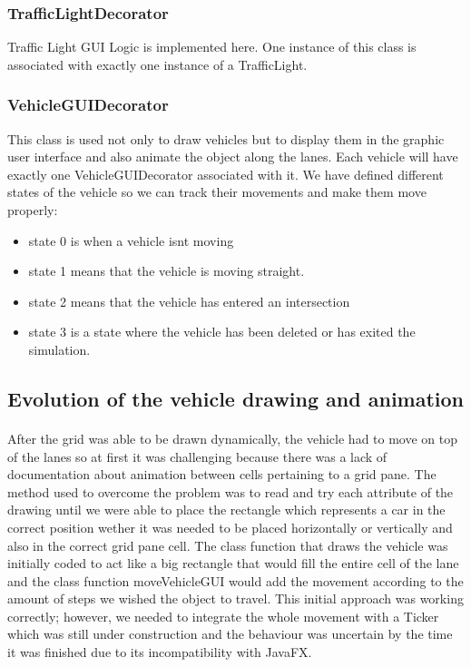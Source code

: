 \documentclass[a4paper]{article}
\begin{document}
\subsubsection{TrafficLightDecorator}
Traffic Light GUI Logic is implemented here. One instance of this class is associated with exactly one instance of a TrafficLight.

\subsubsection{VehicleGUIDecorator}
This class is used not only to draw vehicles but to display them in the graphic user interface and also animate the object along the lanes. Each vehicle will have exactly one VehicleGUIDecorator associated with it. We have defined different states of the vehicle so we can track their movements and make them move properly:

\begin{itemize}
\item state 0 is when a vehicle isn\textsc{}t moving
\item state 1 means that the vehicle is moving straight.
\item state 2 means that the vehicle has entered an intersection
\item state 3 is a state where the vehicle has been deleted or has exited the simulation.
\end{itemize}

\subsection{Evolution of the vehicle drawing and animation}
\paragraph{}
After the grid was able to be drawn dynamically, the vehicle had to move on top of the lanes so at first it was challenging because there was a lack of documentation about animation between cells pertaining to a grid pane. The method used to overcome the problem was to read and try each attribute of the drawing until we were able to place the rectangle which represents a car in the correct position wether it was needed to be placed horizontally or vertically and also in the correct grid pane cell. The class function that draws the vehicle was initially coded to act like a big rectangle that would fill the entire cell of the lane and the class function moveVehicleGUI would add the movement according to the amount of steps we wished the object to travel. This initial approach was working correctly; however, we needed to integrate the whole movement with a Ticker which was still under construction and the behaviour was uncertain by the time it was finished due to its incompatibility with JavaFX.
\end{document}
